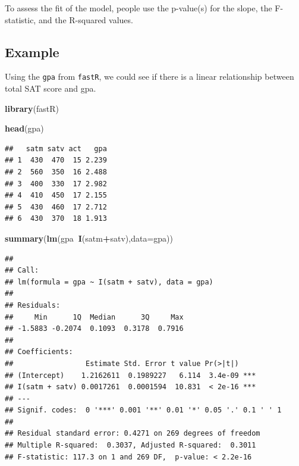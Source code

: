 \documentclass[]{book}
\newenvironment{Shaded}{\begin{snugshade}}{\end{snugshade}}
\newcommand{\KeywordTok}[1]{\textcolor[rgb]{0.13,0.29,0.53}{\textbf{#1}}}
\newcommand{\DataTypeTok}[1]{\textcolor[rgb]{0.13,0.29,0.53}{#1}}
\newcommand{\OperatorTok}[1]{\textcolor[rgb]{0.81,0.36,0.00}{\textbf{#1}}}
\newcommand{\NormalTok}[1]{#1}
\theoremstyle{definition}
\theoremstyle{definition}
\theoremstyle{definition}
\theoremstyle{remark}
\begin{document}
To assess the fit of the model, people use the p-value(s) for the slope,
the F-statistic, and the R-squared values.

\subsection{Example}\label{example-4}

Using the \texttt{gpa} from \texttt{fastR}, we could see if there is a
linear relationship between total SAT score and gpa.

\begin{Shaded}
\begin{Highlighting}[]
\KeywordTok{library}\NormalTok{(fastR)}
\end{Highlighting}
\end{Shaded}

\begin{Shaded}
\begin{Highlighting}[]
\KeywordTok{head}\NormalTok{(gpa)}
\end{Highlighting}
\end{Shaded}

\begin{verbatim}
##   satm satv act   gpa
## 1  430  470  15 2.239
## 2  560  350  16 2.488
## 3  400  330  17 2.982
## 4  410  450  17 2.155
## 5  430  460  17 2.712
## 6  430  370  18 1.913
\end{verbatim}

\begin{Shaded}
\begin{Highlighting}[]
\KeywordTok{summary}\NormalTok{(}\KeywordTok{lm}\NormalTok{(gpa}\OperatorTok{~}\KeywordTok{I}\NormalTok{(satm}\OperatorTok{+}\NormalTok{satv),}\DataTypeTok{data=}\NormalTok{gpa))}
\end{Highlighting}
\end{Shaded}

\begin{verbatim}
## 
## Call:
## lm(formula = gpa ~ I(satm + satv), data = gpa)
## 
## Residuals:
##     Min      1Q  Median      3Q     Max 
## -1.5883 -0.2074  0.1093  0.3178  0.7916 
## 
## Coefficients:
##                 Estimate Std. Error t value Pr(>|t|)    
## (Intercept)    1.2162611  0.1989227   6.114  3.4e-09 ***
## I(satm + satv) 0.0017261  0.0001594  10.831  < 2e-16 ***
## ---
## Signif. codes:  0 '***' 0.001 '**' 0.01 '*' 0.05 '.' 0.1 ' ' 1
## 
## Residual standard error: 0.4271 on 269 degrees of freedom
## Multiple R-squared:  0.3037, Adjusted R-squared:  0.3011 
## F-statistic: 117.3 on 1 and 269 DF,  p-value: < 2.2e-16
\end{verbatim}
\end{document}
